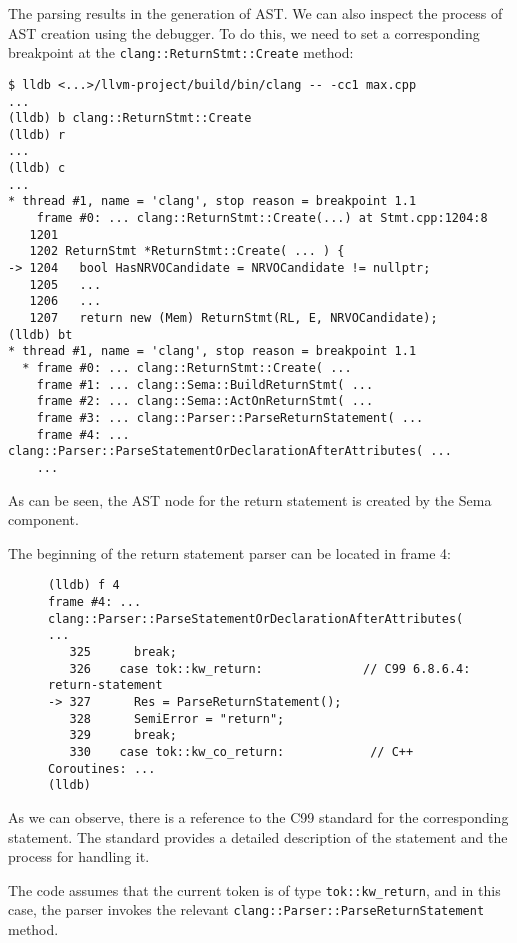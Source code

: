 The parsing results in the generation of AST. We can
also inspect the process of AST creation using the debugger. To do this, we need
to set a corresponding breakpoint at the
\texttt{clang::ReturnStmt::Create} method: 
\begin{verbatim}
$ lldb <...>/llvm-project/build/bin/clang -- -cc1 max.cpp
...
(lldb) b clang::ReturnStmt::Create
(lldb) r
...
(lldb) c
...  
* thread #1, name = 'clang', stop reason = breakpoint 1.1
    frame #0: ... clang::ReturnStmt::Create(...) at Stmt.cpp:1204:8
   1201 
   1202 ReturnStmt *ReturnStmt::Create( ... ) {
-> 1204   bool HasNRVOCandidate = NRVOCandidate != nullptr;
   1205   ...
   1206   ...
   1207   return new (Mem) ReturnStmt(RL, E, NRVOCandidate);
(lldb) bt
* thread #1, name = 'clang', stop reason = breakpoint 1.1
  * frame #0: ... clang::ReturnStmt::Create( ...
    frame #1: ... clang::Sema::BuildReturnStmt( ...
    frame #2: ... clang::Sema::ActOnReturnStmt( ...
    frame #3: ... clang::Parser::ParseReturnStatement( ...
    frame #4: ... clang::Parser::ParseStatementOrDeclarationAfterAttributes( ...
    ...
\end{verbatim}
As can be seen, the AST node for the return statement is created by the Sema
component. 

The beginning of the return statement parser can be located in frame 4:
\begin{figure}
\begin{verbatim}
(lldb) f 4
frame #4: ... clang::Parser::ParseStatementOrDeclarationAfterAttributes( ...
   325      break;
   326    case tok::kw_return:              // C99 6.8.6.4: return-statement
-> 327      Res = ParseReturnStatement();
   328      SemiError = "return";
   329      break;
   330    case tok::kw_co_return:            // C++ Coroutines: ...
(lldb) 
\end{verbatim}
\end{figure}
As we can observe, there is a reference to the C99 standard \citep{standard:c99}
for the corresponding statement. The standard \citep{standard:c99} provides a
detailed description of the statement and the process for handling it. 

The code assumes that the current token is of type
\texttt{tok::kw_return}, and in this case, the parser invokes the
relevant \texttt{clang::Parser::ParseReturnStatement} method. 

